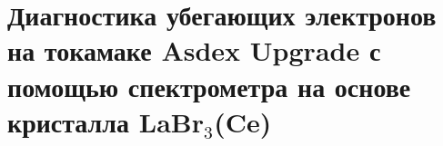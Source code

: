 \chapter{Диагностика убегающих электронов на токамаке Asdex Upgrade с помощью спектрометра на основе кристалла LaBr${}_3$(Ce)}\label{ch:ch5}

\FloatBarrier
